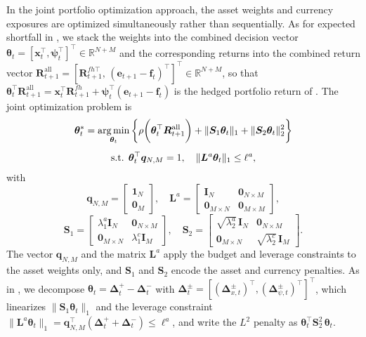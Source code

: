 In the joint portfolio optimization approach, the asset weights and currency exposures are optimized simultaneously
rather than sequentially. As for expected shortfall in , we stack the weights into the combined
decision vector $\bm{\theta}_t = [\bm{x}_t^\top, \bm{\psi}_t^\top]^\top \in \mathbb{R}^{N+M}$ and the corresponding
returns into the combined return vector
$\bm{R}^{\text{all}}_{t+1} = [\bm{R}^{fh\top}_{t+1},\, (\bm{e}_{t+1} - \bm{f}_t)^\top]^\top \in \mathbb{R}^{N+M}$,
so that $\bm{\theta}_t^\top \bm{R}^{\text{all}}_{t+1} = \bm{x}_t^\top \bm{R}^{fh}_{t+1}
+ \bm{\psi}_t^\top (\bm{e}_{t+1} - \bm{f}_t)$ is the hedged portfolio return of .
The joint optimization problem is
\begin{equation} \label{eq:mv_joint_obj}
\begin{gathered}
    \bm{\theta}_t^* = \operatorname*{arg\,min}_{\bm{\theta}_t} \left\{ \rho\biggl( \bm{\theta}_t^\top \bm{R}^{\text{all}}_{t+1} \biggr)
    + \|\bm{S}_1 \bm{\theta}_t\|_1 + \|\bm{S}_2 \bm{\theta}_t\|_2^2 \right\} \\[4pt]
    \text{s.t. } \bm{\theta}_t^\top \bm{q}_{N,M} = 1, \quad \|\bm{L}^a \bm{\theta}_t\|_1 \le \ell^a,
\end{gathered}
\end{equation}
with
\begin{equation*}
    \bm{q}_{N,M} = \begin{bmatrix} \bm{1}_N \\ \bm{0}_M \end{bmatrix}, \quad
    \bm{L}^a = \begin{bmatrix} \bm{I}_N & \bm{0}_{N \times M} \\ \bm{0}_{M \times N} & \bm{0}_{M \times M} \end{bmatrix},
\end{equation*}
\begin{equation*}
    \bm{S}_1 = \begin{bmatrix} \lambda_1^a \bm{I}_N & \bm{0}_{N \times M} \\ \bm{0}_{M \times N} & \lambda_1^c \bm{I}_M \end{bmatrix}, \quad
    \bm{S}_2 = \begin{bmatrix} \sqrt{\lambda_2^a}\, \bm{I}_N & \bm{0}_{N \times M} \\ \bm{0}_{M \times N} & \sqrt{\lambda_2^c}\, \bm{I}_M \end{bmatrix}.
\end{equation*}
The vector $\bm{q}_{N,M}$ and the matrix $\bm{L}^a$ apply the budget and leverage constraints to the asset weights
only, and $\bm{S}_1$ and $\bm{S}_2$ encode the asset and currency penalties. As in ,
we decompose $\bm{\theta}_t = \bm{\Delta}_t^+ - \bm{\Delta}_t^-$ with
$\bm{\Delta}_t^\pm = [(\bm{\Delta}_{x,t}^\pm)^\top, (\bm{\Delta}_{\psi,t}^\pm)^\top]^\top$, which linearizes
$\|\bm{S}_1 \bm{\theta}_t\|_1$ and the leverage constraint
$\|\bm{L}^a \bm{\theta}_t\|_1 = \bm{q}_{N,M}^\top (\bm{\Delta}_t^+ + \bm{\Delta}_t^-) \le \ell^a$, and write the $L^2$
penalty as $\bm{\theta}_t^\top \bm{S}_2^2\, \bm{\theta}_t$.

